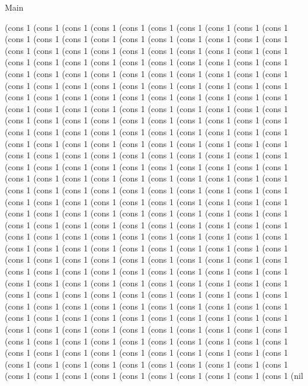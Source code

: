 \begin{lexlean}{Main}
\begin{semanticmodule}
(cons 1 (cons 1 (cons 1 (cons 1 (cons 1 (cons 1 (cons 1 (cons 1 (cons 1 (cons 1 (cons 1 (cons 1 (cons 1 (cons 1 (cons 1 (cons 1 (cons 1 (cons 1 (cons 1 (cons 1 (cons 1 (cons 1 (cons 1 (cons 1 (cons 1 (cons 1 (cons 1 (cons 1 (cons 1 (cons 1 (cons 1 (cons 1 (cons 1 (cons 1 (cons 1 (cons 1 (cons 1 (cons 1 (cons 1 (cons 1 (cons 1 (cons 1 (cons 1 (cons 1 (cons 1 (cons 1 (cons 1 (cons 1 (cons 1 (cons 1 (cons 1 (cons 1 (cons 1 (cons 1 (cons 1 (cons 1 (cons 1 (cons 1 (cons 1 (cons 1 (cons 1 (cons 1 (cons 1 (cons 1 (cons 1 (cons 1 (cons 1 (cons 1 (cons 1 (cons 1 (cons 1 (cons 1 (cons 1 (cons 1 (cons 1 (cons 1 (cons 1 (cons 1 (cons 1 (cons 1 (cons 1 (cons 1 (cons 1 (cons 1 (cons 1 (cons 1 (cons 1 (cons 1 (cons 1 (cons 1 (cons 1 (cons 1 (cons 1 (cons 1 (cons 1 (cons 1 (cons 1 (cons 1 (cons 1 (cons 1 (cons 1 (cons 1 (cons 1 (cons 1 (cons 1 (cons 1 (cons 1 (cons 1 (cons 1 (cons 1 (cons 1 (cons 1 (cons 1 (cons 1 (cons 1 (cons 1 (cons 1 (cons 1 (cons 1 (cons 1 (cons 1 (cons 1 (cons 1 (cons 1 (cons 1 (cons 1 (cons 1 (cons 1 (cons 1 (cons 1 (cons 1 (cons 1 (cons 1 (cons 1 (cons 1 (cons 1 (cons 1 (cons 1 (cons 1 (cons 1 (cons 1 (cons 1 (cons 1 (cons 1 (cons 1 (cons 1 (cons 1 (cons 1 (cons 1 (cons 1 (cons 1 (cons 1 (cons 1 (cons 1 (cons 1 (cons 1 (cons 1 (cons 1 (cons 1 (cons 1 (cons 1 (cons 1 (cons 1 (cons 1 (cons 1 (cons 1 (cons 1 (cons 1 (cons 1 (cons 1 (cons 1 (cons 1 (cons 1 (cons 1 (cons 1 (cons 1 (cons 1 (cons 1 (cons 1 (cons 1 (cons 1 (cons 1 (cons 1 (cons 1 (cons 1 (cons 1 (cons 1 (cons 1 (cons 1 (cons 1 (cons 1 (cons 1 (cons 1 (cons 1 (cons 1 (cons 1 (cons 1 (cons 1 (cons 1 (cons 1 (cons 1 (cons 1 (cons 1 (cons 1 (cons 1 (cons 1 (cons 1 (cons 1 (cons 1 (cons 1 (cons 1 (cons 1 (cons 1 (cons 1 (cons 1 (cons 1 (cons 1 (cons 1 (cons 1 (cons 1 (cons 1 (cons 1 (cons 1 (cons 1 (cons 1 (cons 1 (cons 1 (cons 1 (cons 1 (cons 1 (cons 1 (cons 1 (cons 1 (cons 1 (cons 1 (cons 1 (cons 1 (cons 1 (cons 1 (cons 1 (cons 1 (cons 1 (cons 1 (cons 1 (cons 1 (cons 1 (cons 1 (cons 1 (cons 1 (cons 1 (cons 1 (cons 1 (cons 1 (cons 1 (cons 1 (cons 1 (cons 1 (cons 1 (cons 1 (cons 1 (cons 1 (cons 1 (cons 1 (cons 1 (cons 1 (cons 1 (cons 1 (cons 1 (cons 1 (cons 1 (cons 1 (cons 1 (cons 1 (cons 1 (cons 1 (cons 1 (cons 1 (cons 1 (cons 1 (cons 1 (cons 1 (cons 1 (cons 1 (cons 1 (cons 1 (cons 1 (cons 1 (cons 1 (cons 1 (cons 1 (cons 1 (cons 1 (cons 1 (cons 1 (cons 1 (cons 1 (cons 1 (cons 1 (cons 1 (cons 1 (cons 1 (cons 1 (cons 1 (cons 1 (cons 1 (cons 1 (cons 1 (cons 1 (cons 1 (cons 1 (nil 
\end{semanticmodule}
\end{lexlean}
